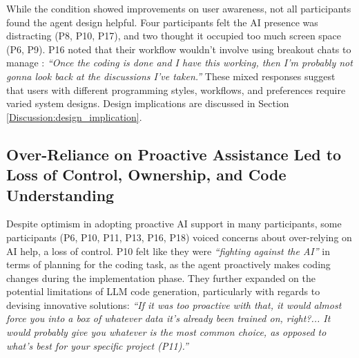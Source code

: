 While the \sys{} condition showed improvements on user awareness, not all participants found the agent design helpful. 
Four participants felt the AI presence was distracting (P8, P10, P17), and two thought it occupied too much screen space (P6, P9). 
P16 noted that their workflow wouldn't involve using breakout chats to manage : \textit{“Once the coding is done and I have this working, then I'm probably not gonna look back at the discussions I've taken.”} 
These mixed responses suggest that users with different programming styles, workflows, and preferences require varied system designs. Design implications are discussed in Section \ref{Discussion:design_implication}.




\subsection{Over-Reliance on Proactive Assistance Led to Loss of Control, Ownership, and Code Understanding}
Despite optimism in adopting proactive AI support in many participants, some participants (P6, P10, P11, P13, P16, P18) voiced concerns about over-relying on AI help,  a loss of control.
P10 felt like they were \textit{``fighting against the AI''} in terms of planning for the coding task, as the agent proactively makes coding changes during the implementation phase.
They further expanded on the potential limitations of LLM code generation, particularly with regards to devising innovative solutions: \textit{``If it was too proactive with that, it would almost force you into a box of whatever data it's already been trained on, right?... It would probably give you whatever is the most common choice, as opposed to what's best for your specific project (P11).''}

